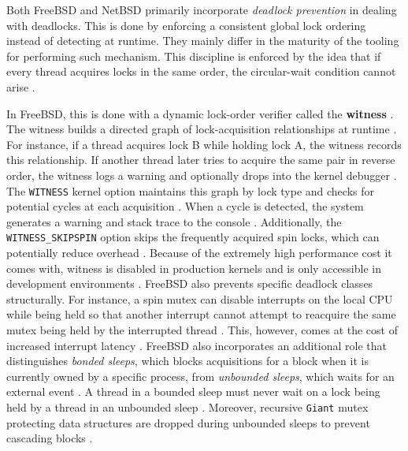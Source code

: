 Both FreeBSD and NetBSD primarily incorporate \textit{deadlock prevention} in dealing with deadlocks. This is done by enforcing a
consistent global lock ordering instead of detecting at runtime. They mainly differ in the maturity of the tooling for performing
such mechanism. This discipline is enforced by the idea that if every thread acquires locks in the same order, the circular-wait
condition cannot arise \parencites{baldwin2002}{netbsd_mutex}.

In FreeBSD, this is done with a dynamic lock-order verifier called the \textbf{witness} \parencite{baldwin2002}. The witness builds
a directed graph of lock-acquisition relationships at runtime \parencite{baldwin2002}. For instance, if a thread acquires lock B
while holding lock A, the witness records this relationship. If another thread later tries to acquire the same pair in reverse
order, the witness logs a warning and optionally drops into the kernel debugger \parencite{baldwin2002}. The \texttt{WITNESS}
kernel option maintains this graph by lock type and checks for potential cycles at each acquisition \parencite{freebsd_kerneldebug}.
When a cycle is detected, the system generates a warning and stack trace to the console \parencite{freebsd_kerneldebug}. Additionally,
the \texttt{WITNESS\_SKIPSPIN} option skips the frequently acquired spin locks, which can potentially reduce overhead
\parencite{freebsd_kerneldebug}. Because of the extremely high performance cost it comes with, witness is disabled in production
kernels and is only accessible in development environments \parencite{baldwin2002}. FreeBSD also prevents specific deadlock classes
structurally. For instance, a spin mutex can disable interrupts on the local CPU while being held so that another interrupt cannot
attempt to reacquire the same mutex being held by the interrupted thread \parencites{mckusick2014_process}{freebsd_mutex}. This, however,
comes at the cost of increased interrupt latency \parencites{mckusick2014_process}{freebsd_mutex}. FreeBSD also incorporates an
additional role that distinguishes \textit{bonded sleeps}, which blocks acquisitions for a block when it is currently owned by
a specific process, from \textit{unbounded sleeps}, which waits for an external event \parencite{freebsd_locking}. A thread in a
bounded sleep must never wait on a lock being held by a thread in an unbounded sleep \parencite{freebsd_locking}. Moreover,
recursive \texttt{Giant} mutex protecting data structures are dropped during unbounded sleeps to prevent cascading blocks
\parencite{freebsd_locking}.

